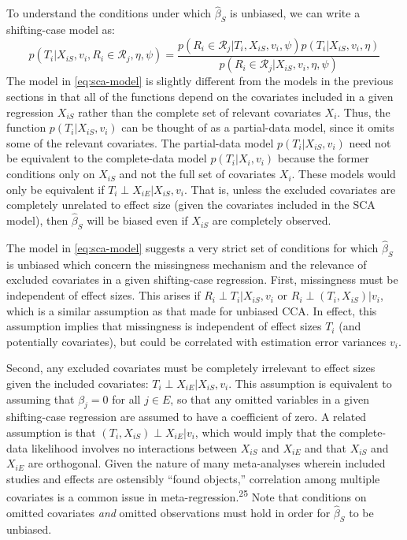 \documentclass[
]{article}
\begin{document}
To understand the conditions under which \(\hat{\beta}_S\) is unbiased, we can write a shifting-case model as:
\begin{equation}
p(T_{i} | X_{iS}, v_i, R_i \in \mathcal{R}_j, \eta, \psi) = \frac{p(R_i \in \mathcal{R}_j | T_i, X_{iS}, v_i, \psi) p(T_i | X_{iS}, v_i, \eta)}{p(R_i \in \mathcal{R}_j | X_{iS}, v_i, \eta, \psi)}
\label{eq:sca-model}
\end{equation}
The model in \eqref{eq:sca-model} is slightly different from the models in the previous sections in that all of the functions depend on the covariates included in a given regression \(X_{iS}\) rather than the complete set of relevant covariates \(X_i\).
Thus, the function \(p(T_i | X_{iS}, v_i)\) can be thought of as a partial-data model, since it omits some of the relevant covariates.
The partial-data model \(p(T_i | X_{iS}, v_i)\) need not be equivalent to the complete-data model \(p(T_i | X_i, v_i)\) because the former conditions only on \(X_{iS}\) and not the full set of covariates \(X_i\).
These models would only be equivalent if \(T_i \perp X_{iE} | X_{iS}, v_i\).
That is, unless the excluded covariates are completely unrelated to effect size (given the covariates included in the SCA model), then \(\hat{\beta}_S\) will be biased even if \(X_{iS}\) are completely observed.

The model in \eqref{eq:sca-model} suggests a very strict set of conditions for which \(\hat{\beta}_S\) is unbiased which concern the missingness mechanism and the relevance of excluded covariates in a given shifting-case regression.
First, missingness must be independent of effect sizes.
This arises if \(R_i \perp T_i | X_{iS}, v_i\) or \(R_i \perp (T_i, X_{iS}) | v_i\), which is a similar assumption as that made for unbiased CCA.
In effect, this assumption implies that missingness is independent of effect sizes \(T_i\) (and potentially covariates), but could be correlated with estimation error variances \(v_i\).

Second, any excluded covariates must be completely irrelevant to effect sizes given the included covariates: \(T_i \perp X_{iE} | X_{iS}, v_i\).
This assumption is equivalent to assuming that \(\beta_j = 0\) for all \(j \in E\), so that any omitted variables in a given shifting-case regression are assumed to have a coefficient of zero.
A related assumption is that \((T_i, X_{iS}) \perp X_{iE} | v_i\), which would imply that the complete-data likelihood involves no interactions between \(X_{iS}\) and \(X_{iE}\) and that \(X_{iS}\) and \(X_{iE}\) are orthogonal.
Given the nature of many meta-analyses wherein included studies and effects are ostensibly ``found objects,'' correlation among multiple covariates is a common issue in meta-regression.\textsuperscript{25}
Note that conditions on omitted covariates \emph{and} omitted observations must hold in order for \(\hat{\beta}_S\) to be unbiased.
\end{document}
